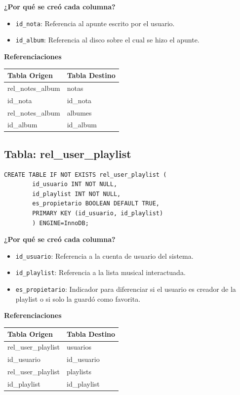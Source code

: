 \documentclass[11pt]{article}
\begin{document}
	\noindent\textbf{¿Por qué se creó cada columna?}
	\begin{itemize}[noitemsep,topsep=2pt]
		\item \texttt{id\_nota}: Referencia al apunte escrito por el usuario.
		\item \texttt{id\_album}: Referencia al disco sobre el cual se hizo el apunte.
	\end{itemize}
	
	\vspace{0.3cm}
	\noindent\textbf{Referenciaciones} \\[0.3em]
	\begin{tabular}{|l|l|}
		\hline
		\textbf{Tabla Origen} & \textbf{Tabla Destino} \\
		\hline
		rel\_notes\_album & notas \\
		id\_nota & id\_nota \\
		\hline
		rel\_notes\_album & albumes \\
		id\_album & id\_album \\
		\hline
	\end{tabular}
	
	\vspace{0.5cm}
	
	\subsection{Tabla: rel\_user\_playlist}
	\begin{lstlisting}[style=sqlstyle]
		CREATE TABLE IF NOT EXISTS rel_user_playlist (
		id_usuario INT NOT NULL,
		id_playlist INT NOT NULL,
		es_propietario BOOLEAN DEFAULT TRUE,
		PRIMARY KEY (id_usuario, id_playlist)
		) ENGINE=InnoDB;
	\end{lstlisting}
	
	\noindent\textbf{¿Por qué se creó cada columna?}
	\begin{itemize}[noitemsep,topsep=2pt]
		\item \texttt{id\_usuario}: Referencia a la cuenta de usuario del sistema.
		\item \texttt{id\_playlist}: Referencia a la lista musical interactuada.
		\item \texttt{es\_propietario}: Indicador para diferenciar si el usuario es creador de la playlist o si solo la guardó como favorita.
	\end{itemize}
	
	\vspace{0.3cm}
	\noindent\textbf{Referenciaciones} \\[0.3em]
	\begin{tabular}{|l|l|}
		\hline
		\textbf{Tabla Origen} & \textbf{Tabla Destino} \\
		\hline
		rel\_user\_playlist & usuarios \\
		id\_usuario & id\_usuario \\
		\hline
		rel\_user\_playlist & playlists \\
		id\_playlist & id\_playlist \\
		\hline
	\end{tabular}
	
\end{document}
